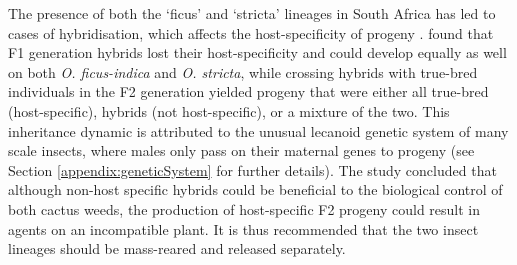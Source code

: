 The presence of both the `ficus' and `stricta' lineages in South Africa has led to cases of hybridisation, which affects the host-specificity of progeny \citep{Hoffmann2002BiologicalBiotypes, Hoffmann2004}. \citet{Hoffmann2002BiologicalBiotypes} found that F1 generation hybrids lost their host-specificity and could develop equally as well on both \textit{O. ficus-indica} and \textit{O. stricta}, while crossing hybrids with true-bred individuals in the F2 generation yielded progeny that were either all true-bred (host-specific), hybrids (not host-specific), or a mixture of the two. This inheritance dynamic is attributed to the unusual lecanoid genetic system of many scale insects, where males only pass on their maternal genes to progeny (see Section \ref{appendix:geneticSystem} for further details). The study concluded that although non-host specific hybrids could be beneficial to the biological control of both cactus weeds, the production of host-specific F2 progeny could result in agents on an incompatible plant. It is thus recommended that the two insect lineages should be mass-reared and released separately. \newline 

